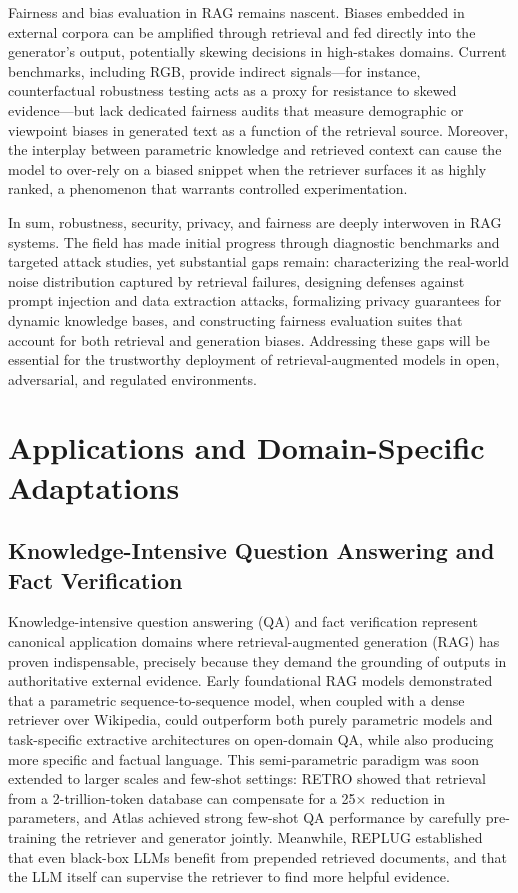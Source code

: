 \documentclass[11pt,a4paper]{article}
\begin{document}
Fairness and bias evaluation in RAG remains nascent. Biases embedded in external corpora can be amplified through retrieval and fed directly into the generator's output, potentially skewing decisions in high-stakes domains. Current benchmarks, including RGB, provide indirect signals---for instance, counterfactual robustness testing acts as a proxy for resistance to skewed evidence---but lack dedicated fairness audits that measure demographic or viewpoint biases in generated text as a function of the retrieval source. Moreover, the interplay between parametric knowledge and retrieved context can cause the model to over-rely on a biased snippet when the retriever surfaces it as highly ranked, a phenomenon that warrants controlled experimentation.

In sum, robustness, security, privacy, and fairness are deeply interwoven in RAG systems. The field has made initial progress through diagnostic benchmarks and targeted attack studies, yet substantial gaps remain: characterizing the real-world noise distribution captured by retrieval failures, designing defenses against prompt injection and data extraction attacks, formalizing privacy guarantees for dynamic knowledge bases, and constructing fairness evaluation suites that account for both retrieval and generation biases. Addressing these gaps will be essential for the trustworthy deployment of retrieval-augmented models in open, adversarial, and regulated environments.


\section{Applications and Domain-Specific Adaptations}



\subsection{Knowledge-Intensive Question Answering and Fact Verification}


Knowledge-intensive question answering (QA) and fact verification represent canonical application domains where retrieval-augmented generation (RAG) has proven indispensable, precisely because they demand the grounding of outputs in authoritative external evidence. Early foundational RAG models \cite{arxiv:2005.11401v4} demonstrated that a parametric sequence-to-sequence model, when coupled with a dense retriever over Wikipedia, could outperform both purely parametric models and task-specific extractive architectures on open-domain QA, while also producing more specific and factual language. This semi-parametric paradigm was soon extended to larger scales and few-shot settings: RETRO \cite{arxiv:2112.04426v3} showed that retrieval from a 2-trillion-token database can compensate for a 25$\times$ reduction in parameters, and Atlas \cite{arxiv:2208.03299v3} achieved strong few-shot QA performance by carefully pre-training the retriever and generator jointly. Meanwhile, REPLUG \cite{arxiv:2301.12652v4} established that even black-box LLMs benefit from prepended retrieved documents, and that the LLM itself can supervise the retriever to find more helpful evidence.
\end{document}
